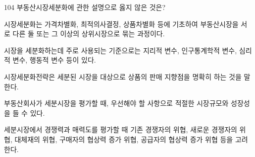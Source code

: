 \begin{question}{104}
부동산시장세분화에 관한 설명으로 옳지 않은 것은?
\begin{choices}
  \item 시장세분화는 가격차별화, 최적의사결정, 상품차별화 등에 기초하여 부동산시장을 서로 다른 둘 또는 그 이상의 상위시장으로 묶는 과정이다.
  \item 시장을 세분화하는데 주로 사용되는 기준으로는 지리적 변수, 인구통계학적 변수, 심리적 변수, 행동적 변수 등이 있다.
  \item 시장세분화전략은 세분된 시장을 대상으로 상품의 판매 지향점을 명확히 하는 것을 말한다.
  \item 부동산회사가 세분시장을 평가할 때, 우선해야 할 사항으로 적절한 시장규모와 성장성을 들 수 있다.
  \item 세분시장에서 경쟁력과 매력도를 평가할 때 기존 경쟁자의 위협, 새로운 경쟁자의 위협, 대체재의 위협, 구매자의 협상력 증가 위협, 공급자의 협상력 증가 위협 등을 고려한다.
\end{choices}
\end{question}
